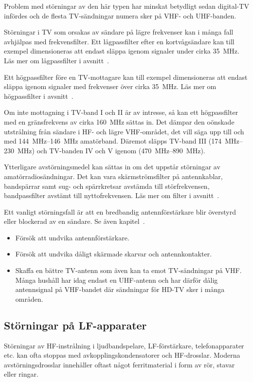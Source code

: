 Problem med störningar av den här typen har minskat betydligt sedan digital-TV
infördes och de flesta TV-sändningar numera sker på VHF- och UHF-banden.

Störningar i TV som orsakas av sändare på lägre frekvenser kan i många fall
avhjälpas med frekvensfilter.
Ett lågpassfilter efter en kortvågsändare kan till exempel dimensioneras att
endast släppa igenom signaler under cirka \qty{35}{\mega\hertz}.
Läs mer om lågpassfilter i avsnitt~.

Ett högpassfilter före en TV-mottagare kan till exempel dimensioneras att
endast släppa igenom signaler med frekvenser över cirka \qty{35}{\mega\hertz}.
Läs mer om högpassfilter i avsnitt~.

Om inte mottagning i TV-band I och II är av intresse, så kan ett högpassfilter
med en gränsfrekvens av cirka \qty{160}{\mega\hertz} sättas in.
Det dämpar den oönskade utstrålning från sändare i HF- och lägre VHF-området,
det vill säga upp till och med \SIrange{144}{146}{\mega\hertz} amatörband.
Däremot släpps TV-band III (\SIrange{174}{230}{\mega\hertz}) och TV-banden IV
och V igenom (\SIrange{470}{890}{\mega\hertz}).

Ytterligare avstörningsmedel kan sättas in om det uppstår störningar av
amatörradiosändningar.
Det kan vara skärmströmsfilter på antennkablar, bandspärrar samt sug- och
spärrkretsar avstämda till störfrekvensen, bandpassfilter avstämt till
nyttofrekvensen.
Läs mer om filter i avsnitt~.

Ett vanligt störningsfall är att en bredbandig antennförstärkare blir
överstyrd eller blockerad av en sändare. Se även kapitel~.

\begin{itemize}
\item Försök att undvika antennförstärkare.
\item Försök att undvika dåligt skärmade skarvar och antennkontakter.
\item Skaffa en bättre TV-antenn som även kan ta emot TV-sändningar på VHF.
  Många hushåll har idag endast en UHF-antenn och har därför dålig
  antennsignal på VHF-bandet där sändningar för HD-TV sker i många områden.
\end{itemize}

\subsection{Störningar på LF-apparater}

Störningar av HF-instrålning i ljudbandspelare, LF-förstärkare, telefonapparater
etc. kan ofta stoppas med avkopplingskondensatorer och HF-drosslar.
Moderna avstörningsdrosslar innehåller oftast något ferritmaterial i form av
rör, stavar eller ringar.
